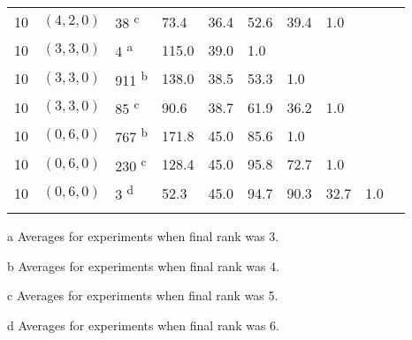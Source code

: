 \begin{table*}[ht]
\begin{threeparttable}
\begin{tabular}{llllllllll}
      10  & $(4, 2, 0)$          & 38 \textsuperscript{c}  & 73.4  & 36.4    & 52.6    & 39.4    & 1.0     &         \\
      10  & $(3, 3, 0)$          & 4 \textsuperscript{a}   & 115.0 & 39.0    & 1.0     &         &         &         \\
      10  & $(3, 3, 0)$          & 911 \textsuperscript{b} & 138.0 & 38.5    & 53.3    & 1.0     &         &         \\
      10  & $(3, 3, 0)$          & 85 \textsuperscript{c}  & 90.6  & 38.7    & 61.9    & 36.2    & 1.0     &         \\
      10  & $(0, 6, 0)$          & 767 \textsuperscript{b} & 171.8 & 45.0    & 85.6    & 1.0     &         &         \\
      10  & $(0, 6, 0)$          & 230 \textsuperscript{c} & 128.4 & 45.0    & 95.8    & 72.7    & 1.0     &         \\
      10  & $(0, 6, 0)$          & 3 \textsuperscript{d}   & 52.3  & 45.0    & 94.7    & 90.3    & 32.7    & 1.0     \\
      \bottomrule\addlinespace[1ex]
    \end{tabular}
    \begin{tablenotes}\footnotesize
      \item [a] Averages for experiments when final rank was 3.
      \item [b] Averages for experiments when final rank was 4.
      \item [c] Averages for experiments when final rank was 5.
      \item [d] Averages for experiments when final rank was 6.
    \end{tablenotes}
  \end{threeparttable}
\end{table*}

